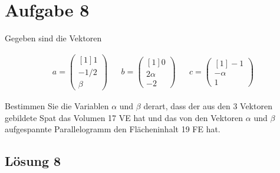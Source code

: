 \documentclass[main.tex]{subfiles}
\begin{document}
\section{Aufgabe 8}
Gegeben sind die Vektoren

\begin{align*}
    a=\begin{pmatrix}[1]
    1\\
    -1/2\\
    \beta
    \end{pmatrix} & & b=\begin{pmatrix}[1]
    0\\
    2\alpha \\
    -2
    \end{pmatrix} & & c=\begin{pmatrix}[1]
    -1\\
    -\alpha \\
    1
    \end{pmatrix}
\end{align*}

Bestimmen Sie die Variablen $\alpha$ und $\beta$ derart, dass der aus den 3 Vektoren gebildete Spat das Volumen 17 VE hat und das von den Vektoren $\alpha$ und $\beta$ aufgespannte Parallelogramm den Flächeninhalt 19 FE hat.

\subsection{Lösung 8}

\end{document}
